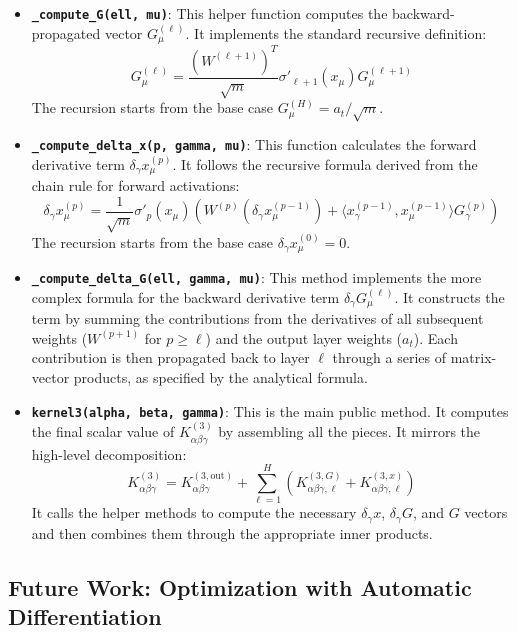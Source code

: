 \documentclass[a4paper]{article}
\begin{document}
\begin{itemize}
    \item \textbf{\texttt{\_compute\_G(ell, mu)}}: This helper function computes the backward-propagated vector $G^{(\ell)}_\mu$. It implements the standard recursive definition:
    \[ G^{(\ell)}_\mu = \frac{(W^{(\ell+1)})^T}{\sqrt{m}} \sigma'_{\ell+1}(x_\mu) G^{(\ell+1)}_\mu \]
    The recursion starts from the base case $G^{(H)}_\mu = a_t / \sqrt{m}$.

    \item \textbf{\texttt{\_compute\_delta\_x(p, gamma, mu)}}: This function calculates the forward derivative term $\delta_\gamma x^{(p)}_\mu$. It follows the recursive formula derived from the chain rule for forward activations:
    \[ \delta_\gamma x^{(p)}_\mu = \frac{1}{\sqrt{m}} \sigma'_{p}(x_\mu) \left( W^{(p)} (\delta_\gamma x^{(p-1)}_\mu) + \langle x^{(p-1)}_\gamma, x^{(p-1)}_\mu \rangle G^{(p)}_\gamma \right) \]
    The recursion starts from the base case $\delta_\gamma x^{(0)}_\mu = 0$.

    \item \textbf{\texttt{\_compute\_delta\_G(ell, gamma, mu)}}: This method implements the more complex formula for the backward derivative term $\delta_\gamma G^{(\ell)}_\mu$. It constructs the term by summing the contributions from the derivatives of all subsequent weights ($W^{(p+1)}$ for $p \ge \ell$) and the output layer weights ($a_t$). Each contribution is then propagated back to layer $\ell$ through a series of matrix-vector products, as specified by the analytical formula.

    \item \textbf{\texttt{kernel3(alpha, beta, gamma)}}: This is the main public method. It computes the final scalar value of $K^{(3)}_{\alpha\beta\gamma}$ by assembling all the pieces. It mirrors the high-level decomposition:
    \[ K^{(3)}_{\alpha\beta\gamma} = K^{(3, \text{out})}_{\alpha\beta\gamma} + \sum_{\ell=1}^H \left( K^{(3, G)}_{\alpha\beta\gamma, \ell} + K^{(3, x)}_{\alpha\beta\gamma, \ell} \right) \]
    It calls the helper methods to compute the necessary $\delta_\gamma x$, $\delta_\gamma G$, and $G$ vectors and then combines them through the appropriate inner products.
\end{itemize}

\subsection{Future Work: Optimization with Automatic Differentiation}
\end{document}
